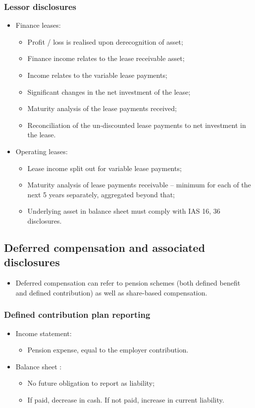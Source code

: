 \documentclass[../notes_compiled.tex]{subfiles}
\begin{document}
\subsubsection{Lessor disclosures}
\begin{itemize}
\item Finance leases:
\begin{itemize}
\item Profit / loss is realised upon derecognition of asset;
\item Finance income relates to the lease receivable asset;
\item Income relates to the variable lease payments;
\item Significant changes in the net investment of the lease;
\item Maturity analysis of the lease payments received;
\item Reconciliation of the un-discounted lease payments to net investment in the lease.
\end{itemize}
\item Operating leases:
\begin{itemize}
\item Lease income split out for variable lease payments;
\item Maturity analysis of lease payments receivable -- minimum for each of the next 5 years separately, aggregated beyond that;
\item Underlying asset in balance sheet must comply with IAS 16, 36 disclosures.
\end{itemize}
\end{itemize}

\subsection{Deferred compensation and associated disclosures}
\begin{itemize}
\item Deferred compensation can refer to pension schemes (both defined benefit and defined contribution) as well as share-based compensation.
\end{itemize}

\subsubsection{Defined contribution plan reporting}
\begin{itemize}
\item Income statement:
\begin{itemize}
\item Pension expense, equal to the employer contribution.
\end{itemize}
\item Balance sheet :
\begin{itemize}
\item No future obligation to report as liability;
\item If paid, decrease in cash. If not paid, increase in current liability.
\end{itemize}
\end{itemize}
\end{document}
